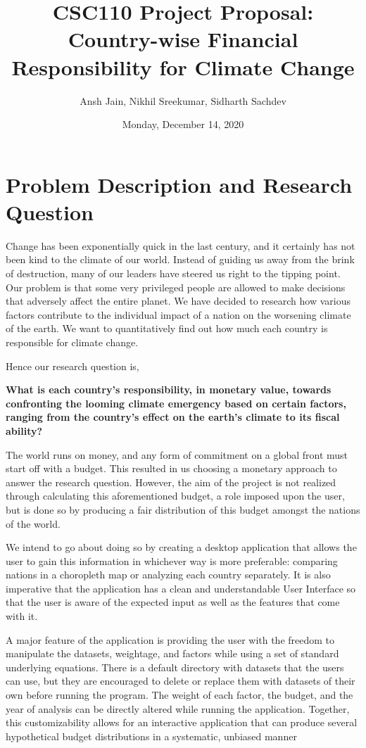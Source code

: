 \documentclass[fontsize=11pt]{article}
\title{CSC110 Project Proposal: Country-wise Financial Responsibility for Climate Change}
\author{Ansh Jain, Nikhil Sreekumar, Sidharth Sachdev}
\date{Monday, December 14, 2020}
\begin{document}
    \maketitle

    \section*{Problem Description and Research Question}

    Change has been exponentially quick in the last century, and it certainly has not been kind to the climate of our world. Instead of guiding us away from the brink of destruction, many of our leaders have steered us right to the tipping point. Our problem is that some very privileged people are allowed to make decisions that adversely affect the entire planet. We have decided to research how various factors contribute to the individual impact of a nation on the worsening climate of the earth. We want to quantitatively find out how much each country is responsible for climate change.\newline

    Hence our research question is,

    \textbf{What is each country’s responsibility, in monetary value, towards confronting the looming climate emergency based on certain factors, ranging from the country’s effect on the earth’s climate to its fiscal ability?}\newline

    The world runs on money, and any form of commitment on a global front must start off with a budget. This resulted in us choosing a monetary approach to answer the research question. However, the aim of the project is not realized through calculating this aforementioned budget, a role imposed upon the user, but is done so by producing a fair distribution of this budget amongst the nations of the world.\newline

    We intend to go about doing so by creating a desktop application that allows the user to gain this information in whichever way is more preferable: comparing nations in a choropleth map or analyzing each country separately. It is also imperative that the application has a clean and understandable User Interface so that the user is aware of the expected input as well as the features that come with it.\newline


    A major feature of the application is providing the user with the freedom to manipulate the datasets, weightage, and factors while using a set of standard underlying equations. There is a default directory with datasets that the users can use, but they are encouraged to delete or replace them with datasets of their own before running the program. The weight of each factor, the budget, and the year of analysis can be directly altered while running the application. Together, this customizability allows for an interactive application that can produce several hypothetical budget distributions in a systematic, unbiased manner
\end{document}
